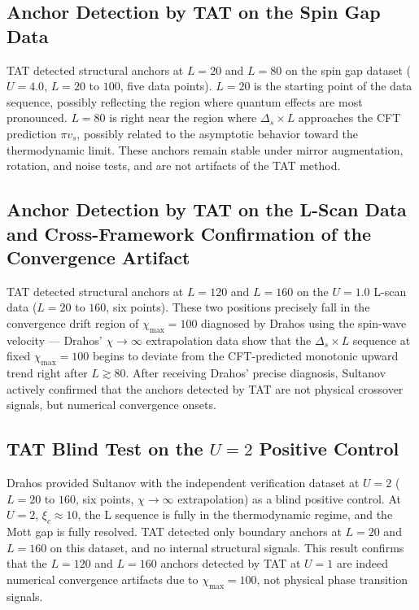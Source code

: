 \documentclass[prb,reprint,twocolumn,superscriptaddress]{revtex4-2}
\begin{document}
\subsection{Anchor Detection by TAT on the Spin Gap Data}

TAT detected structural anchors at $L=20$ and $L=80$ on the spin gap dataset ($U=4.0$, $L=20$ to $100$, five data points). $L=20$ is the starting point of the data sequence, possibly reflecting the region where quantum effects are most pronounced. $L=80$ is right near the region where $\Delta_s \times L$ approaches the CFT prediction $\pi v_s$, possibly related to the asymptotic behavior toward the thermodynamic limit. These anchors remain stable under mirror augmentation, rotation, and noise tests, and are not artifacts of the TAT method.

\subsection{Anchor Detection by TAT on the L-Scan Data and Cross-Framework Confirmation of the Convergence Artifact}

TAT detected structural anchors at $L=120$ and $L=160$ on the $U=1.0$ L-scan data ($L=20$ to $160$, six points). These two positions precisely fall in the convergence drift region of $\chi_{\max}=100$ diagnosed by Drahos using the spin-wave velocity --- Drahos' $\chi \to \infty$ extrapolation data show that the $\Delta_s \times L$ sequence at fixed $\chi_{\max}=100$ begins to deviate from the CFT-predicted monotonic upward trend right after $L \gtrsim 80$. After receiving Drahos' precise diagnosis, Sultanov actively confirmed that the anchors detected by TAT are not physical crossover signals, but numerical convergence onsets.

\subsection{TAT Blind Test on the $U=2$ Positive Control}

Drahos provided Sultanov with the independent verification dataset at $U=2$ ($L=20$ to $160$, six points, $\chi \to \infty$ extrapolation) as a blind positive control. At $U=2$, $\xi_c \approx 10$, the L sequence is fully in the thermodynamic regime, and the Mott gap is fully resolved. TAT detected only boundary anchors at $L=20$ and $L=160$ on this dataset, and no internal structural signals. This result confirms that the $L=120$ and $L=160$ anchors detected by TAT at $U=1$ are indeed numerical convergence artifacts due to $\chi_{\max}=100$, not physical phase transition signals.
\end{document}
